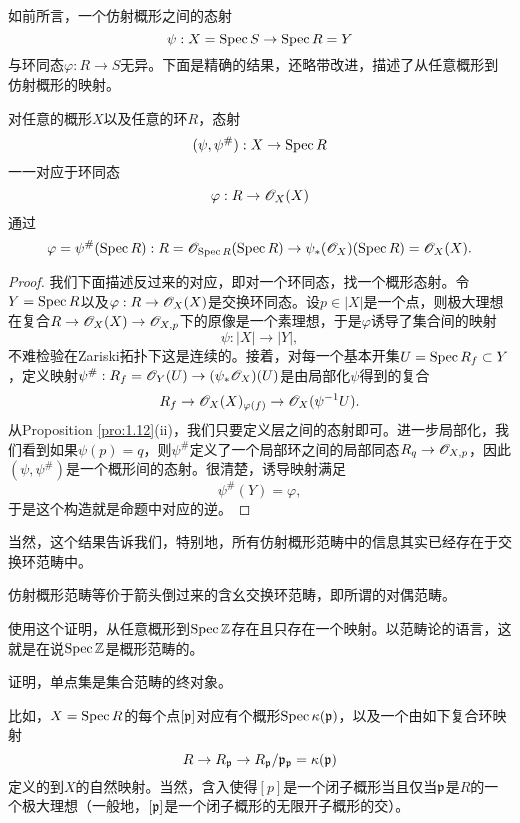 如前所言，一个仿射概形之间的态射
\[
	\psi:X=\operatorname{Spec} S\to\operatorname{Spec} R=Y
\]
与环同态$\varphi:R\to S$无异。下面是精确的结果，还略带改进，描述了从任意概形到仿射概形的映射。

\begin{thm}\label{thm:1.40}
对任意的概形$X$以及任意的环$R$，态射
\[
	(\psi,\psi^\#):X\to \operatorname{Spec} R
\]
一一对应于环同态
\[
	\varphi:R\to \mathscr{O}_X(X)
\]
通过
\[
	\varphi=\psi^\#(\operatorname{Spec} R):R=\mathscr{O}_{\operatorname{Spec} R}(\operatorname{Spec} R)\to \psi_*(\mathscr{O}_X)(\operatorname{Spec} R)=\mathscr{O}_X(X).
\]
\end{thm}

\begin{proof}
我们下面描述反过来的对应，即对一个环同态，找一个概形态射。令$Y=\operatorname{Spec} R$以及$\varphi:R\to \mathscr{O}_X(X)$是交换环同态。设$p\in |X|$是一个点，则极大理想在复合$R\to \mathscr{O}_X(X)\to \mathscr{O}_{X,p}$下的原像是一个素理想，于是$\varphi$诱导了集合间的映射
\[
	\psi:|X|\to |Y|,
\]
不难检验在Zariski拓扑下这是连续的。接着，对每一个基本开集$U=\operatorname{Spec} R_f\subset Y$，定义映射$\psi^\#:R_f=\mathscr{O}_Y(U)\to (\psi_*\mathscr{O}_X)(U)$是由局部化$\psi$得到的复合
\[
	R_f\to \mathscr{O}_X(X)_{\varphi(f)}\to \mathscr{O}_X(\psi^{-1}U).
\]
从Proposition \ref{pro:1.12}(ii)，我们只要定义层之间的态射即可。进一步局部化，我们看到如果$\psi(p)=q$，则$\psi^\#$定义了一个局部环之间的局部同态$R_q\to \mathscr{O}_{X,p}$，因此$(\psi,\psi^\#)$是一个概形间的态射。很清楚，诱导映射满足
\[
	\psi^\#(Y)=\varphi,
\]
于是这个构造就是命题中对应的逆。
\end{proof}

当然，这个结果告诉我们，特别地，所有仿射概形范畴中的信息其实已经存在于交换环范畴中。

\begin{coro}\label{coro:1.41}
	仿射概形范畴等价于箭头倒过来的含幺交换环范畴，即所谓的对偶范畴。
\end{coro}

\begin{exe}\label{exe:1.42}
	\begin{compactenum}[(a)]
	\item 使用这个证明，从任意概形到$\operatorname{Spec} \mathbb{Z}$存在且只存在一个映射。以范畴论的语言，这就是在说$\operatorname{Spec} \mathbb{Z}$是概形范畴的。
	\item 证明，单点集是集合范畴的终对象。
	\end{compactenum}
\end{exe}

比如，$X=\operatorname{Spec} R$的每个点$[\mathfrak{p}]$对应有个概形$\operatorname{Spec} \kappa(\mathfrak{p})$，以及一个由如下复合环映射
\[
	R\to R_{\mathfrak{p}}\to R_{\mathfrak{p}}/\mathfrak{p}_{\mathfrak{p}}=\kappa(\mathfrak{p})
\]
定义的到$X$的自然映射。当然，含入使得$[p]$是一个闭子概形当且仅当$\mathfrak{p}$是$R$的一个极大理想（一般地，$[\mathfrak{p}]$是一个闭子概形的无限开子概形的交）。

